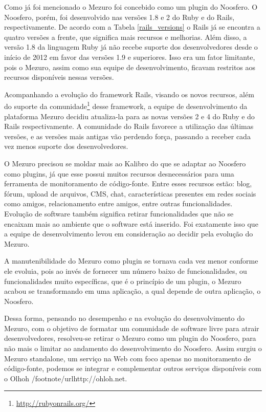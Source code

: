   
Como já foi mencionado o Mezuro foi concebido como um plugin do Noosfero. O Noosfero, porém, foi desenvolvido nas versões 1.8 e 2 do Ruby e do Rails, respectivamente. De acordo com a Tabela \ref{rails_versions} o Rails já se encontra a quatro versões a frente, que significa mais recursos e melhorias. Além disso, a versão 1.8 da linguagem Ruby já não recebe suporte dos desenvolvedores desde o início de 2012 em favor das versões 1.9 e superiores. Isso era um fator limitante, pois o Mezuro, assim como sua equipe de desenvolvimento, ficavam restritos aos recursos disponíveis nessas versões.

Acompanhando a evolução do framework Rails, visando os novos recursos, além do suporte da comunidade\footnote{\url{http://rubyonrails.org/}} desse framework, a equipe de desenvolvimento da plataforma Mezuro decidiu atualiza-la para as novas versões 2 e 4 do Ruby e do Rails respectivamente. A comunidade do Rails favorece a utilização das últimas versões, e as versões mais antigas vão perdendo força, passando a receber cada vez menos suporte dos desenvolvedores.

O Mezuro precisou se moldar mais ao Kalibro do que se adaptar ao Noosfero como plugins, já que esse possui muitos recursos desnecessários para uma ferramenta de monitoramento de código-fonte. Entre esses recursos estão: blog, fórum, upload de arquivos, CMS, chat, características presentes em redes sociais como amigos, relacionamento entre amigos, entre outras funcionalidades. Evolução de software também significa retirar funcionalidades que não se encaixam mais ao ambiente que o software está inserido. Foi exatamente isso que a equipe de desenvolvimento levou em consideração ao decidir pela evolução do Mezuro.

A manutenibilidade do Mezuro como plugin se tornava cada vez menor conforme ele evoluia, pois ao invés de fornecer um número baixo de funcionalidades, ou funcionalidades muito específicas, que é o princípio de um plugin, o Mezuro acabou se transformando em uma aplicação, a qual depende de outra aplicação, o Noosfero. 

Dessa forma, pensando no desempenho e na evolução do desenvolvimento do Mezuro, com o objetivo de formatar um comunidade de software livre para atrair desenvolvedores, resolveu-se retirar o Mezuro como um plugin do Noosfero, para não mais o limitar ao andamento do desenvolvimento do Noosfero. Assim surgiu o Mezuro standalone, um serviço na Web com foco apenas no monitoramento de código-fonte, podemos se integrar e complementar outros serviços disponíveis com o Olhoh /footnote{/url{http://ohloh.net}}.

